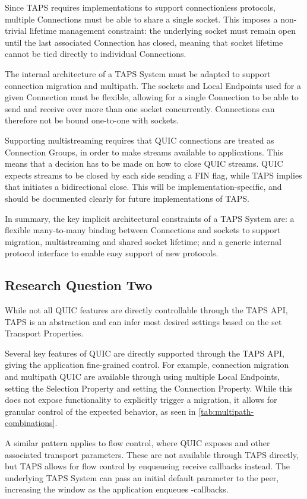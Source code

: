 Since TAPS requires implementations to support connectionless protocols,
multiple Connections must be able to share a single socket. This imposes
a non-trivial lifetime management constraint: the underlying socket must
remain open until the last associated Connection has closed, meaning
that socket lifetime cannot be tied directly to individual Connections.

The internal architecture of a TAPS System must be adapted to support 
connection migration and multipath. The sockets and Local Endpoints used
for a given Connection must be flexible, allowing for a single Connection
to be able to send and receive over more than one socket concurrently.
Connections can therefore not be bound one-to-one with sockets.

Supporting multistreaming requires that QUIC connections are treated
as Connection Groups, in order to make streams available to applications.
This means that a decision has to be made on how to close QUIC streams.
QUIC expects streams to be closed by
each side sending a FIN flag, while TAPS implies that 
initiates a bidirectional close. This will be implementation-specific,
and should be documented clearly for future implementations of TAPS.

In summary, the key implicit architectural constraints of a TAPS System are:
a flexible many-to-many binding between Connections and sockets to support
migration, multistreaming and shared socket lifetime; and a generic internal
protocol interface to enable easy support of new protocols.

\subsection{Research Question Two}
While not all QUIC features are directly controllable through the TAPS API,
TAPS is an abstraction and can infer most desired settings based on the
set Transport Properties.

Several key features of QUIC are directly supported through the TAPS
API, giving the application fine-grained control.
For example, connection migration and multipath QUIC are available
through using multiple Local Endpoints, setting the 
Selection Property and setting the  Connection Property.
While this does not expose functionality to explicitly trigger a migration,
it allows for granular control of the expected behavior, as seen in
\cref{tab:multipath-combinations}.

A similar pattern applies to flow control, where QUIC exposes 
and other associated transport parameters. These are not available through TAPS directly, but TAPS allows for flow 
control by enqueueing receive callbacks instead. The underlying TAPS System
can pass an initial default parameter to the peer,
increasing the window as the application enqueues -callbacks.

